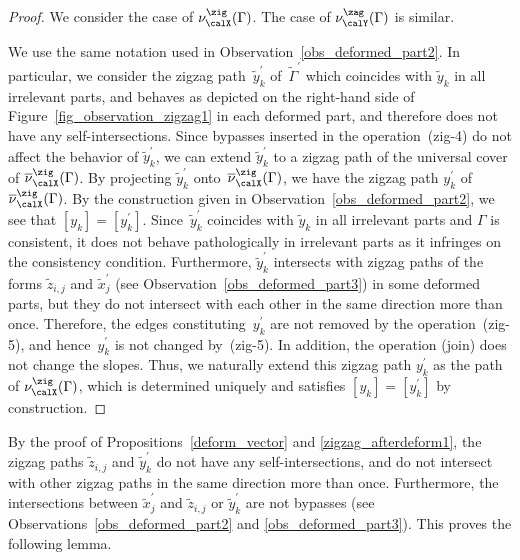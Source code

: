 \begin{proof}We consider the case of $\nu^\zig_\calX(\Gamma)$. The case of $\nu^\zag_\calY(\Gamma)$ is similar.

We use the same notation used in Observation~\ref{obs_deformed_part2}.
In particular, we consider the zigzag path~$\widetilde{y}^\prime_k$ of~$\widetilde{\Gamma}^\prime$ which coincides with $\widetilde{y}_k$ in all irrelevant parts, and behaves as depicted on the right-hand side of Figure~\ref{fig_observation_zigzag1} in each deformed part,
and therefore does not have any self-intersections.
Since bypasses inserted in the operation~(zig-4) do not affect the behavior of $\widetilde{y}^\prime_k$, we can extend $\widetilde{y}^\prime_k$ to a zigzag path of the universal cover of $\overline{\nu}^\zig_\calX(\Gamma)$.
By projecting $\widetilde{y}^\prime_k$ onto~$\overline{\nu}^\zig_\calX(\Gamma)$, we have the zigzag path $y_k^\prime$ of $\overline{\nu}^\zig_\calX(\Gamma)$.
By the construction given in Observation~\ref{obs_deformed_part2}, we see that $[y_k]=[y_k^\prime]$.
Since~$\widetilde{y}^\prime_k$ coincides with $\widetilde{y}_k$ in all irrelevant parts and $\Gamma$ is consistent, it does not behave pathologically in irrelevant parts as it infringes on the consistency condition.
Furthermore, $\widetilde{y}^\prime_k$ intersects with zigzag paths of the forms $\widetilde{z}_{i,j}$ and $\widetilde{x}^\prime_j$ (see Observation~\ref{obs_deformed_part3}) in some deformed parts, but they do not intersect with each other in the same direction more than once.
Therefore, the edges constituting~$y_k^\prime$ are not removed by the operation~(zig-5), and hence~$y_k^\prime$ is not changed by~(zig-5).
In addition, the operation (join) does not change the slopes.
Thus, we naturally extend this zigzag path $y_k^\prime$ as the path of $\nu^\zig_\calX(\Gamma)$, which is determined uniquely and satisfies $[y_k]=[y_k^\prime]$ by construction.
\end{proof}

By the proof of Propositions~\ref{deform_vector} and \ref{zigzag_afterdeform1}, the zigzag paths $\widetilde{z}_{i,j}$
and $\widetilde{y}^\prime_k$ do not have any self-intersections,
and do not intersect with other zigzag paths in the same direction more than once.
Furthermore, the intersections between $\widetilde{x}^\prime_j$ and $\widetilde{z}_{i,j}$ or $\widetilde{y}^\prime_k$ are not bypasses
(see Observations~\ref{obs_deformed_part2} and \ref{obs_deformed_part3}). This proves the following lemma.

